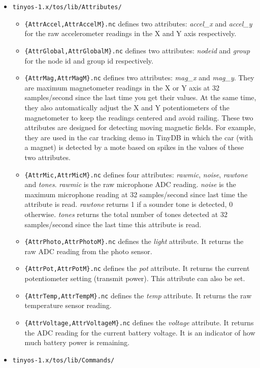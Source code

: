 \documentclass[11pt]{article}
\newcommand{\docroot}{tinyos-1.x}
\begin{document}
\begin{itemize}
\item {\tt \docroot/tos/lib/Attributes/}
\begin{itemize}
\item {\tt \{AttrAccel,AttrAccelM\}.nc} defines two attributes: {\em accel\_x}
and {\em accel\_y} for the raw accelerometer readings in the X and Y axis
respectively.
\item {\tt \{AttrGlobal,AttrGlobalM\}.nc} defines two attributes: {\em nodeid}
and {\em group} for the node id and group id respectively.
\item {\tt \{AttrMag,AttrMagM\}.nc} defines two attributes: {\em mag\_x}
and {\em mag\_y}.  They are maximum magnetometer readings in the X or Y axis
at 32 samples/second since the last time you get their values.  At the same
time, they also automatically adjust the X and Y potentiometers
of the magnetometer to keep the readings centered and avoid railing.
These two attributes are designed for detecting moving magnetic fields.
For example, they are used in the car tracking demo in TinyDB in which
the car (with a magnet) is detected by a mote based on spikes in
the values of these two attributes.
\item {\tt \{AttrMic,AttrMicM\}.nc} defines four attributes: {\em rawmic},
{\em noise}, {\em rawtone} and {\em tones}.  {\em rawmic} is the raw
microphone ADC reading.  {\em noise} is the maximum microphone reading
at 32 samples/second since last time the attribute is read.  {\em rawtone}
returns 1 if a sounder tone is detected, 0 otherwise.  {\em tones} returns
the total number of tones detected at 32 samples/second since the last
time this attribute is read.
\item {\tt \{AttrPhoto,AttrPhotoM\}.nc} defines the {\em light} attribute.
It returns the raw ADC reading from the photo sensor.
\item {\tt \{AttrPot,AttrPotM\}.nc} defines the {\em pot} attribute.  It
returns the current potentiometer setting (transmit power).  
This attribute can also be set.
\item {\tt \{AttrTemp,AttrTempM\}.nc} defines the {\em temp} attribute.  It
returns the raw temperature sensor reading.
\item {\tt \{AttrVoltage,AttrVoltageM\}.nc} defines the {\em voltage} attribute.
It returns the ADC reading for the current battery voltage.  It is an indicator
of how much battery power is remaining.
\end{itemize}
\item {\tt \docroot/tos/lib/Commands/}

\end{itemize}
\end{document}
